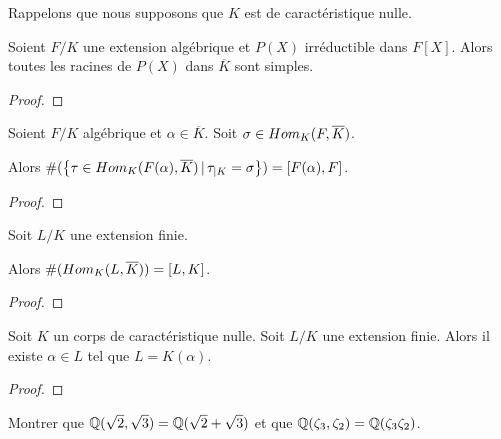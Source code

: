 \begin{proposition}
	Rappelons que nous supposons que $K$ est de caractéristique nulle.

	Soient $F/K$ une extension algébrique et $P(X)$ irréductible dans $F[X]$.
	Alors toutes les racines de $P(X)$ dans $\overline{K}$ sont simples.
\end{proposition}

\ifdefined\outputproof
\begin{proof}

\end{proof}
\fi

\begin{corollary}
	Soient $F/K$ algébrique et $\alpha \in \overline{K}$.
	Soit $\sigma \in Hom_{K}(F, \overline{K})$.

	Alors $\#(\left\{\tau \in Hom_{K}(F(\alpha), \overline{K}) \, | \, \tau_{|K} =
\sigma \right\}) = [F(\alpha), F]$.
\end{corollary}

\ifdefined\outputproof
\begin{proof}

\end{proof}
\fi

\begin{proposition}
	Soit $L/K$ une extension finie.

	Alors $\#(Hom_{K}(L, \overline{K})) = [L, K]$.
\end{proposition}

\ifdefined\outputproof
\begin{proof}

\end{proof}
\fi



\begin{theorem} 
	\label{theorem:primitif_element}
	Soit $K$ un corps de caractéristique nulle.
	Soit $L/K$ une extension finie. Alors il existe $\alpha \in L$ tel que $L =
	K(\alpha)$.
\end{theorem}

\ifdefined\outputproof
\begin{proof}

\end{proof}
\fi

\begin{exercice}
	Montrer que $\mathbb{Q}(\sqrt{2}, \sqrt{3}) = \mathbb{Q}(\sqrt{2} + \sqrt{3})$
	et que $\mathbb{Q}(\zeta_{3}, \zeta_{2}) = \mathbb{Q}(\zeta_{3} \zeta_{2})$.
\end{exercice}

